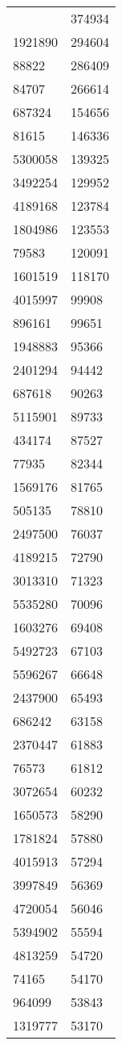 \documentclass[a4paper]{article}
\begin{document}
\begin{center}
\begin{longtable}{|l|l|}
\hline %
\endlastfoot
5302153 & 374934 \\
1921890 & 294604 \\
88822 & 286409 \\
84707 & 266614 \\
687324 & 154656 \\
81615 & 146336 \\
5300058 & 139325 \\
3492254 & 129952 \\
4189168 & 123784 \\
1804986 & 123553 \\
79583 & 120091 \\
1601519 & 118170 \\
4015997 & 99908 \\
896161 & 99651 \\
1948883 & 95366 \\
2401294 & 94442 \\
687618 & 90263 \\
5115901 & 89733 \\
434174 & 87527 \\
77935 & 82344 \\
1569176 & 81765 \\
505135 & 78810 \\
2497500 & 76037 \\
4189215 & 72790 \\
3013310 & 71323 \\
5535280 & 70096 \\
1603276 & 69408 \\
5492723 & 67103 \\
5596267 & 66648 \\
2437900 & 65493 \\
686242 & 63158 \\
2370447 & 61883 \\
76573 & 61812 \\
3072654 & 60232 \\
1650573 & 58290 \\
1781824 & 57880 \\
4015913 & 57294 \\
3997849 & 56369 \\
4720054 & 56046 \\
5394902 & 55594 \\
4813259 & 54720 \\
74165 & 54170 \\
964099 & 53843 \\
1319777 & 53170 \\

\end{longtable}
\end{center}
\end{document}
